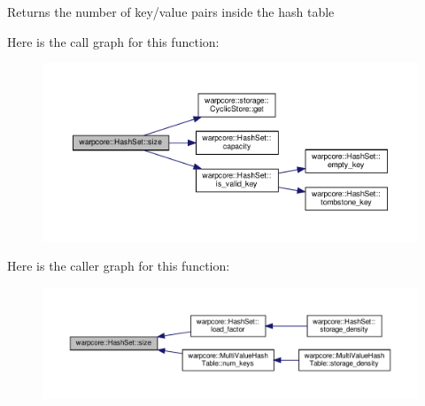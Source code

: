 \begin{DoxyReturn}{Returns}
the number of key/value pairs inside the hash table 
\end{DoxyReturn}
Here is the call graph for this function\+:
\nopagebreak
\begin{figure}[H]
\begin{center}
\leavevmode
\includegraphics[width=350pt]{classwarpcore_1_1HashSet_a06649688aa7e9f6538965f1dec18c82b_cgraph}
\end{center}
\end{figure}
Here is the caller graph for this function\+:
\nopagebreak
\begin{figure}[H]
\begin{center}
\leavevmode
\includegraphics[width=350pt]{classwarpcore_1_1HashSet_a06649688aa7e9f6538965f1dec18c82b_icgraph}
\end{center}
\end{figure}
\mbox{\label{classwarpcore_1_1HashSet_a178dec74a9404d6b89f37febec381dca}} 

